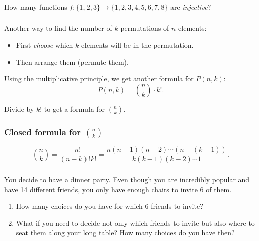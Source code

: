 \documentclass[11pt, compress]{beamer}
\begin{document}
\begin{frame}
\frametitle{}
\begin{example}How many functions \(f:\{1,2,3\} \to \{1,2,3,4,5,6,7,8\}\) are \emph{injective}?
\end{example}
\end{frame}
 
\begin{frame}
\frametitle{}
Another way to find the number of \(k\)-permutations of \(n\) elements:\begin{itemize}
\item{} First \emph{choose} which \(k\) elements will be in the permutation.


\item{} Then arrange them (permute them).

\end{itemize}
Using the multiplicative principle, we get another formula for \(P(n,k)\):%
\begin{equation*}
P(n,k) = {n \choose k}\cdot k!\text{.}
\end{equation*}

 
\pause \vfill 

Divide by \(k!\) to get a formula for \(\binom{n}{k}\).
\end{frame}
 
\begin{frame}
\frametitle{Closed formula for \({n \choose k}\)}
\begin{equation*}
{n \choose k} = \frac{n!}{(n-k)!k!} = \frac{n(n-1)(n-2)\cdots(n-(k-1))}{k(k-1)(k-2)\cdots 1}\text{.}
\end{equation*}

\end{frame}
 
\begin{frame}
\frametitle{}
\begin{example}[1.3.5]You decide to have a dinner party. Even though you are incredibly popular and have 14 different friends, you only have enough chairs to invite 6 of them.
\begin{enumerate}
\item{} How many choices do you have for which 6 friends to invite?


\item{} What if you need to decide not only which friends to invite but also where to seat them along your long table? How many choices do you have then?

\end{enumerate}

\end{example}
\end{frame}
 
\end{document}

